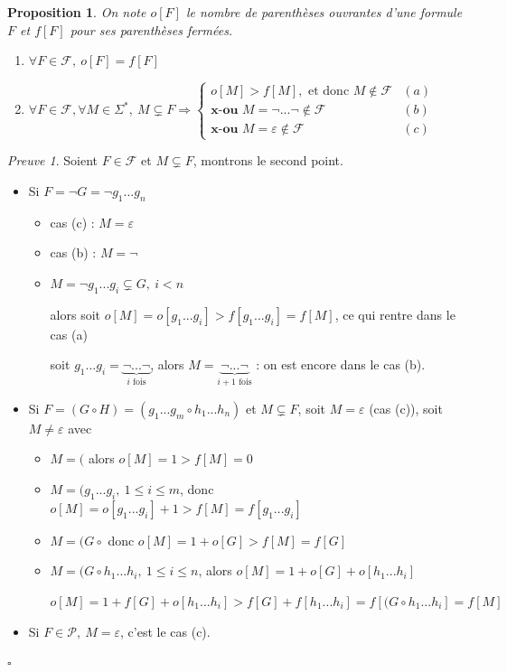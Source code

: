 \documentclass[]{article}
\newtheorem{myproposition}{Proposition}
\theoremstyle{remark}
\newtheorem{myproof}{Preuve}
\theoremstyle{definition}
\newcommand{\cqfd}{
	\hfill$\square$
}
\begin{document}
\begin{myproposition}
	On note $o[F]$ le nombre de parenthèses ouvrantes d'une formule $F$ et $f[F]$ pour ses parenthèses fermées.
	\begin{enumerate}
			\item $\forall F \in \mathcal{F}, ~ o[F]=f[F]$
			\item $\forall F \in \mathcal{F}, \forall M \in \Sigma^*, ~ M \subsetneq F \Longrightarrow
			\left\{
			\begin{array}{ll}
				o[M] > f[M], \text{ et donc } M \notin \mathcal{F} & (a) \\
				\textbf{x-ou } M = \neg ... \neg \notin \mathcal{F} & (b)\\
				\textbf{x-ou } M = \varepsilon \notin \mathcal{F} & (c)
			\end{array}
			\right.$
	\end{enumerate}
\end{myproposition}

\begin{myproof}
	Soient $F \in \mathcal{F}$ et $M \subsetneq F$, montrons le second point.
	
	\begin{itemize}
		\item Si $F=\neg G = \neg g_1 ... g_n$
		
		\begin{itemize}
			\item cas (c) : $M=\varepsilon$
			\item cas (b) : $M=\neg$
			\item $M=\neg g_1 ... g_i \subsetneq G, ~ i < n$
			
			alors soit $o[M] = o[g_1...g_i] > f[g_1 ... g_i] = f[M]$, ce qui rentre dans le cas (a)
			
			soit $g_1...g_i = \underbrace{\neg ... \neg}_{i \text{ fois}}$, alors $M=\underbrace{\neg ... \neg}_{i + 1 \text{ fois}}$ : on est encore dans le cas (b).
		\end{itemize}
		
		\item Si $F=(G \circ H) = (g_1 ... g_m \circ h_1 ... h_n)$ et $M \subsetneq F$, soit $M=\varepsilon$ (cas (c)), soit $M \neq \varepsilon$ avec
		
		\begin{itemize}
			\item $M=($ alors $o[M]=1 > f[M] = 0$
			\item $M=(g_1...g_i, ~ 1 \leqslant i \leqslant m$, donc $o[M]=o[g_1...g_i] + 1 > f[M] = f[g_1...g_i]$
			\item $M=(G \circ$ donc $o[M]=1+o[G] > f[M]=f[G]$
			\item $M=(G \circ h_1 ... h_i, ~ 1 \leqslant i \leqslant n$, alors $o[M] = 1 + o[G] + o[h_1...h_i]$
			
			$o[M] = 1 + f[G] + o[h_1...h_i] > f[G] + f[h_1...h_i] = f[(G \circ h_1...h_i] = f[M]$
		\end{itemize}
		
		\item Si $F \in \mathcal{P}, ~ M=\varepsilon$, c'est le cas (c).
	\end{itemize}
	
	\cqfd
\end{myproof}
\end{document}
